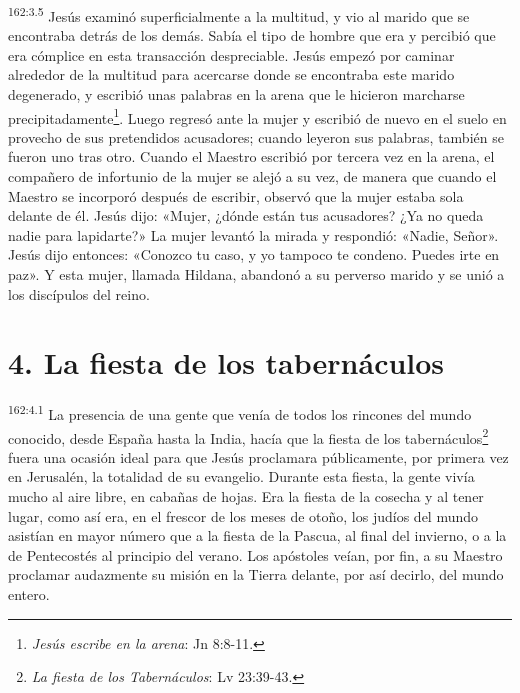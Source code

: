 \par
\textsuperscript{162:3.5} Jesús examinó superficialmente a la multitud, y vio al marido que se encontraba detrás de los demás. Sabía el tipo de hombre que era y percibió que era cómplice en esta transacción despreciable. Jesús empezó por caminar alrededor de la multitud para acercarse donde se encontraba este marido degenerado, y escribió unas palabras en la arena que le hicieron marcharse precipitadamente\footnote{\textit{Jesús escribe en la arena}: Jn 8:8-11.}. Luego regresó ante la mujer y escribió de nuevo en el suelo en provecho de sus pretendidos acusadores; cuando leyeron sus palabras, también se fueron uno tras otro. Cuando el Maestro escribió por tercera vez en la arena, el compañero de infortunio de la mujer se alejó a su vez, de manera que cuando el Maestro se incorporó después de escribir, observó que la mujer estaba sola delante de él. Jesús dijo: «Mujer, ¿dónde están tus acusadores? ¿Ya no queda nadie para lapidarte?» La mujer levantó la mirada y respondió: «Nadie, Señor». Jesús dijo entonces: «Conozco tu caso, y yo tampoco te condeno. Puedes irte en paz». Y esta mujer, llamada Hildana, abandonó a su perverso marido y se unió a los discípulos del reino.

\section*{4. La fiesta de los tabernáculos}
\par
\textsuperscript{162:4.1} La presencia de una gente que venía de todos los rincones del mundo conocido, desde España hasta la India, hacía que la fiesta de los tabernáculos\footnote{\textit{La fiesta de los Tabernáculos}: Lv 23:39-43.} fuera una ocasión ideal para que Jesús proclamara públicamente, por primera vez en Jerusalén, la totalidad de su evangelio. Durante esta fiesta, la gente vivía mucho al aire libre, en cabañas de hojas. Era la fiesta de la cosecha y al tener lugar, como así era, en el frescor de los meses de otoño, los judíos del mundo asistían en mayor número que a la fiesta de la Pascua, al final del invierno, o a la de Pentecostés al principio del verano. Los apóstoles veían, por fin, a su Maestro proclamar audazmente su misión en la Tierra delante, por así decirlo, del mundo entero.

